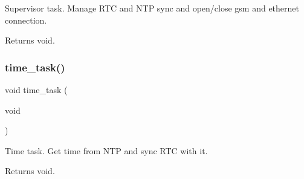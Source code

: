 Supervisor task. Manage R\+TC and N\+TP sync and open/close gsm and ethernet connection. 

\begin{DoxyReturn}{Returns}
void. 
\end{DoxyReturn}
\mbox{\label{rmap_8ino_a35c29025c5ef3d135b8c2b038be3f8df}} 
\subsubsection{\texorpdfstring{time\+\_\+task()}{time\_task()}}
{\footnotesize\ttfamily void time\+\_\+task (\begin{DoxyParamCaption}\item[{void}]{ }\end{DoxyParamCaption})}



Time task. Get time from N\+TP and sync R\+TC with it. 

\begin{DoxyReturn}{Returns}
void. 
\end{DoxyReturn}
